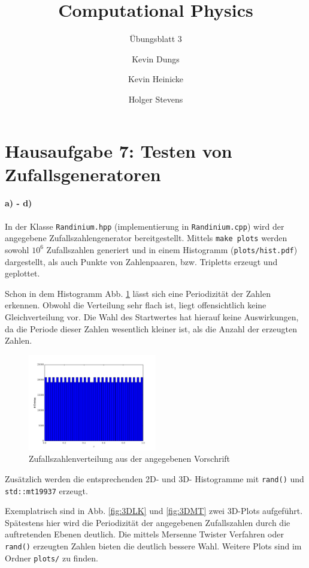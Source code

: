 \documentclass{scrartcl}
\author{Kevin Dungs \and Kevin Heinicke \and Holger Stevens}
\title{Computational Physics}
\subtitle{Übungsblatt 3}
\begin{document}
\maketitle

\section*{Hausaufgabe 7: Testen von Zufallsgeneratoren}
\paragraph{a) - d)} In der Klasse \texttt{Randinium.hpp} (implementierung in \texttt{Randinium.cpp}) wird der angegebene Zufallszahlengenerator bereitgestellt.
Mittels \texttt{make plots} werden sowohl $10^6$ Zufallszahlen generiert und in einem Histogramm (\texttt{plots/hist.pdf}) dargestellt, als auch Punkte von Zahlenpaaren, bzw. Tripletts erzeugt und geplottet.

Schon in dem Histogramm Abb. \ref{fig:histogram} lässt sich eine Periodizität der Zahlen erkennen. Obwohl die Verteilung sehr flach ist, liegt offensichtlich keine Gleichverteilung vor.
Die Wahl des Startwertes hat hierauf keine Auswirkungen, da die Periode dieser Zahlen wesentlich kleiner ist, als die Anzahl der erzeugten Zahlen.

\begin{figure}[H]
    \centering
    \includegraphics[width=0.5\textwidth]{plots/hist.pdf}
    \caption{Zufallszahlenverteilung aus der angegebenen Vorschrift}
    \label{fig:histogram}
\end{figure}

Zusätzlich werden die entsprechenden 2D- und 3D- Histogramme mit \texttt{rand()} und \texttt{std::mt19937} erzeugt.


Exemplatrisch sind in Abb. \ref{fig:3DLK} und \ref{fig:3DMT} zwei 3D-Plots aufgeführt. Spätestens hier wird die Periodizität der angegebenen Zufallszahlen durch die auftretenden Ebenen deutlich. Die mittels Mersenne Twister Verfahren oder \texttt{rand()} erzeugten Zahlen bieten die deutlich bessere Wahl. Weitere Plots sind im Ordner \texttt{plots/} zu finden.
\end{document}
